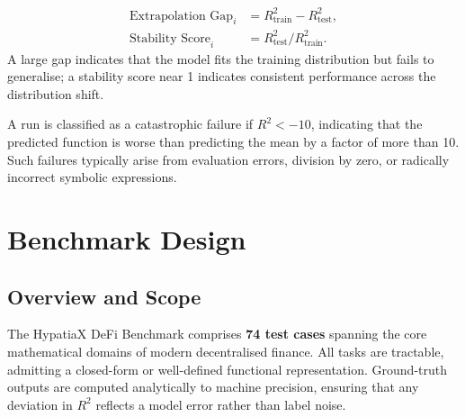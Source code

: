 \documentclass[twoside,11pt]{article}
\newcommand{\Rsq}{R^{2}}
\newcommand{\Rtrain}{R^{2}_{\mathrm{train}}}
\newcommand{\Rtest}{R^{2}_{\mathrm{test}}}
\begin{document}
\begin{definition}
\begin{align}
  \text{Extrapolation Gap}_i &= \Rtrain - \Rtest, \label{eq:gap}\\
  \text{Stability Score}_i   &= \Rtest / \Rtrain. \label{eq:stability}
\end{align}
A large gap indicates that the model fits the training distribution but fails
to generalise; a stability score near 1 indicates consistent performance across
the distribution shift.
\end{definition}

\begin{definition}
A run is classified as a catastrophic failure if $\Rsq < -10$, indicating that
the predicted function is worse than predicting the mean by a factor of more
than 10.  Such failures typically arise from evaluation errors, division by
zero, or radically incorrect symbolic expressions.
\end{definition}

\section{Benchmark Design}
\label{sec:benchmark}

\subsection{Overview and Scope}\label{subsec:overview-and-scope}
\label{sec:bench_overview}

The HypatiaX DeFi Benchmark comprises \textbf{74 test cases} spanning the core
mathematical domains of modern decentralised finance.  All tasks are tractable,
admitting a closed-form or well-defined functional representation.  Ground-truth
outputs are computed analytically to machine precision, ensuring that any
deviation in $\Rsq$ reflects a model error rather than label noise.
\end{document}
